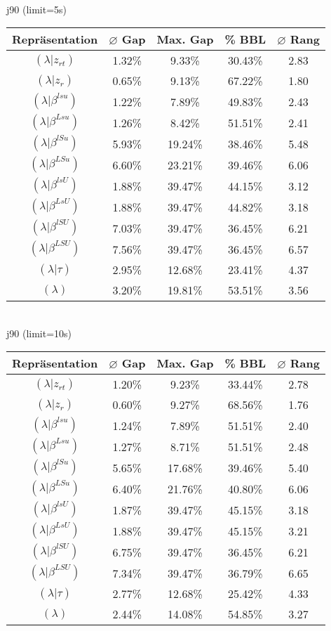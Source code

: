 \documentclass{scrartcl}
\begin{document}
\\[8pt]j90 (limit=5s)\\\begin{tabular}{ccccc}
\hline
Repräsentation & $\varnothing$ Gap & Max. Gap & \% BBL & $\varnothing$ Rang\\[3pt]
\hline
$(\lambda|z_{rt})$&1.32\%&9.33\%&30.43\%&2.83\\
\hline
$(\lambda|z_r)$&0.65\%&9.13\%&67.22\%&1.80\\
\hline
$(\lambda|\beta^{lsu})$&1.22\%&7.89\%&49.83\%&2.43\\
\hline
$(\lambda|\beta^{Lsu})$&1.26\%&8.42\%&51.51\%&2.41\\
\hline
$(\lambda|\beta^{lSu})$&5.93\%&19.24\%&38.46\%&5.48\\
\hline
$(\lambda|\beta^{LSu})$&6.60\%&23.21\%&39.46\%&6.06\\
\hline
$(\lambda|\beta^{lsU})$&1.88\%&39.47\%&44.15\%&3.12\\
\hline
$(\lambda|\beta^{LsU})$&1.88\%&39.47\%&44.82\%&3.18\\
\hline
$(\lambda|\beta^{lSU})$&7.03\%&39.47\%&36.45\%&6.21\\
\hline
$(\lambda|\beta^{LSU})$&7.56\%&39.47\%&36.45\%&6.57\\
\hline
$(\lambda|\tau)$&2.95\%&12.68\%&23.41\%&4.37\\
\hline
$(\lambda)$&3.20\%&19.81\%&53.51\%&3.56\\\hline
\end{tabular}
\\[8pt]
\newpage
j90 (limit=10s)\\\begin{tabular}{ccccc}
\hline
Repräsentation & $\varnothing$ Gap & Max. Gap & \% BBL & $\varnothing$ Rang\\[3pt]
\hline
$(\lambda|z_{rt})$&1.20\%&9.23\%&33.44\%&2.78\\
\hline
$(\lambda|z_r)$&0.60\%&9.27\%&68.56\%&1.76\\
\hline
$(\lambda|\beta^{lsu})$&1.24\%&7.89\%&51.51\%&2.40\\
\hline
$(\lambda|\beta^{Lsu})$&1.27\%&8.71\%&51.51\%&2.48\\
\hline
$(\lambda|\beta^{lSu})$&5.65\%&17.68\%&39.46\%&5.40\\
\hline
$(\lambda|\beta^{LSu})$&6.40\%&21.76\%&40.80\%&6.06\\
\hline
$(\lambda|\beta^{lsU})$&1.87\%&39.47\%&45.15\%&3.18\\
\hline
$(\lambda|\beta^{LsU})$&1.88\%&39.47\%&45.15\%&3.21\\
\hline
$(\lambda|\beta^{lSU})$&6.75\%&39.47\%&36.45\%&6.21\\
\hline
$(\lambda|\beta^{LSU})$&7.34\%&39.47\%&36.79\%&6.65\\
\hline
$(\lambda|\tau)$&2.77\%&12.68\%&25.42\%&4.33\\
\hline
$(\lambda)$&2.44\%&14.08\%&54.85\%&3.27\\\hline
\end{tabular}
\end{document}
